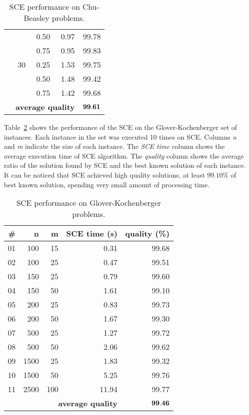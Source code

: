 \begin{table}
{\begin{center}
\begin{tabular}{|r|r|r|rr|}
    &    & 0.50 & 0.97 & 99.78 \\
    &    & 0.75 & 0.95 & 99.83 \\ \cline{2-5}
    & 30 & 0.25 & 1.53 & 99.75 \\
    &    & 0.50 & 1.48 & 99.42 \\
    &    & 0.75 & 1.42 & 99.68 \\ \cline{2-5}
    & \multicolumn{3}{r}{\textbf{average quality}}  & $\bf 99.61$  \\ \hline
\end{tabular}
\end{center}
}
 \caption{SCE performance on Chu-Beasley problems.}
 \label{tab:chu}
\end{table}

Table~\ref{tab:gk} shows the performance of the SCE on the Glover-Kochenberger set of instances.
Each instance in the set was executed 10 times on SCE.
Columns \textit{n} and \textit{m} indicate the size of each instance.
The \textit{SCE time} column shows the average execution time of SCE algorithm.
The \textit{quality} column shows the average ratio of the solution found by SCE and
the best known solution of each instance.
It can be noticed that SCE achieved high quality solutions, at least $99.10\%$
of best known solution, spending very small amount of processing time.

\begin{table}
{
\renewcommand{\arraystretch}{1.5}%
\fontsize{8.5pt}{1em}\selectfont 
\begin{center}
\begin{tabular}{|r|r|r|r|r|} \hline
		\textbf{\#} & \textbf{n}   & \textbf{m}  & \textbf{SCE time (s)} & \textbf{quality (\%)} \\ \hline
01 & 100 & 15 & 0.31 & 99.68 \\ \hline
02 & 100 & 25 & 0.47 & 99.51 \\ \hline
03 & 150 & 25 & 0.79 & 99.60 \\ \hline
04 & 150 & 50 & 1.61 & 99.10 \\ \hline
05 & 200 & 25 & 0.83 & 99.73 \\ \hline
06 & 200 & 50 & 1.67 & 99.30 \\ \hline
07 & 500 & 25 & 1.27 & 99.72 \\ \hline
08 & 500 & 50 & 2.06 & 99.62 \\ \hline
09 &1500 & 25 & 1.83 & 99.32 \\ \hline
10 &1500 & 50 & 5.25 & 99.76 \\ \hline
11 &2500 &100 &11.94 & 99.77 \\ \cline{1-5}
    \multicolumn{4}{|r|}{\textbf{average quality}}  & $\bf 99.46$  \\ \hline
\end{tabular}
\end{center}
}
 \caption{SCE performance on Glover-Kochenberger problems.}
 \label{tab:gk}
\end{table}

